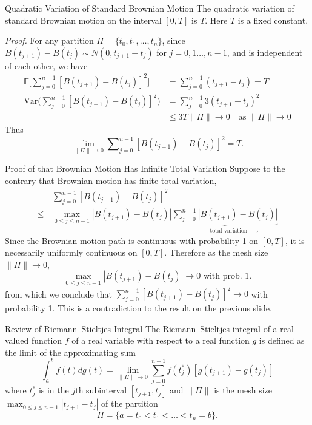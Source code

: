 \documentclass[letterpaper,handout]{beamer}
\def\Sum{\sum\nolimits}
\def\E{\mathbb E}
\def\V{\mathrm{Var}}
\begin{document}
\begin{frame}{Quadratic Variation of Standard Brownian Motion}
The quadratic variation of standard Brownian motion on the interval $[0,T]$ is $T$.
Here $T$ is a fixed constant.\par\medskip

{\em Proof.}
For any partition $\Pi =\{t_0,t_1,\ldots,t_n\}$, since $B(t_{j+1})-B(t_j)\sim N(0,t_{j+1}-t_j)$ for $j=0,1\ldots,n-1$, and is independent of each other, we have
\begin{align*}
\E\Big[\Sum_{j=0}^{n-1}[B(t_{j+1})-B(t_j)]^2\Big]&=\Sum_{j=0}^{n-1}(t_{j+1}-t_j)=T\\
\V\Big(\Sum_{j=0}^{n-1}[B(t_{j+1})-B(t_j)]^2\Big)&=\Sum_{j=0}^{n-1}3(t_{j+1}-t_j)^2\\
&\le 3 T \|\Pi\|\longrightarrow 0\quad\mbox{as }\|\Pi\|\to 0
\end{align*}
Thus $$\lim_{\|\Pi\|\to 0}\Sum_{j=0}^{n-1}[B(t_{j+1})-B(t_j)]^2=T.$$
\end{frame}
\begin{frame}{Proof of that Brownian Motion Has Infinite Total Variation}
Suppose to the contrary that Brownian motion has finite total variation,
\begin{align*}
&\Sum_{j=0}^{n-1}[B(t_{j+1})-B(t_j)]^2\\
\le\,& \max_{0\le j\le n-1}|B(t_{j+1})-B(t_j)|\underbrace{\Sum_{j=0}^{n-1}|B(t_{j+1})-B(t_j)|}_{\to\; \text{total variation}}
\end{align*}
Since the Brownian motion path is continuous with probability 1 on $[0, T]$,
it is necessarily uniformly continuous on $[0, T]$. Therefore as the mesh size $\|\Pi\|\to 0$,
$$
\max_{0\le j\le n-1}|B(t_{j+1})-B(t_j)|\to 0 \text{ with prob. 1.}
$$
from which we conclude that $\sum_{j=0}^{n-1}[B(t_{j+1})-B(t_j)]^2\to 0$ with probability 1.
This is a contradiction to the result on the previous slide.

\end{frame}
\begin{frame}{Review of Riemann--Stieltjes Integral}
The Riemann--Stieltjes integral of a real-valued function $f$ of a real variable with respect to a real function $g$ is defined as the limit of the approximating sum
$$\int_a^b f(t)dg(t)=\lim_{\|\Pi\|\to 0}\sum_{j=0}^{n-1}f(t_j^*)[g(t_{j+1})-g(t_j)]$$
where $t_j^*$ is in the $j$th subinterval $[t_{j+1}, t_{j}]$
and $\|\Pi\|$ is the mesh size $\displaystyle\max_{0\le j\le n-1}|t_{j+1}-t_j|$ of the partition $$\Pi =\{a=t_0<t_1<\ldots<t_n=b\}.$$
\end{frame}
\end{document}
